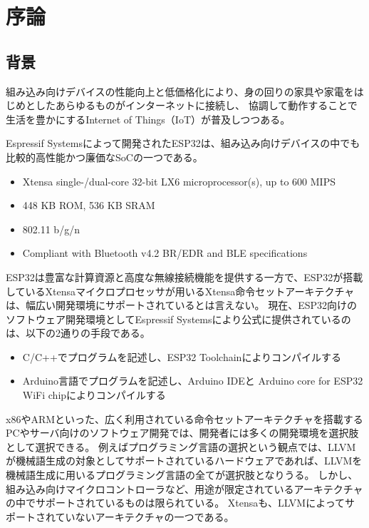 \chapter{序論}
\label{chap:introduction}

\section{背景}
\label{section:background}

組み込み向けデバイスの性能向上と低価格化により、身の回りの家具や家電をはじめとしたあらゆるものがインターネットに接続し、
協調して動作することで生活を豊かにするInternet of Things（IoT）が普及しつつある。

Espressif Systemsによって開発されたESP32\cite{esp32}は、組み込み向けデバイスの中でも比較的高性能かつ廉価なSoCの一つである。

\begin{itemize}
  \item Xtensa single-/dual-core 32-bit LX6 microprocessor(s), up to 600 MIPS
  \item 448 KB ROM, 536 KB SRAM
  \item 802.11 b/g/n
  \item Compliant with Bluetooth v4.2 BR/EDR and BLE specifications
\end{itemize}

ESP32は豊富な計算資源と高度な無線接続機能を提供する一方で、ESP32が搭載しているXtensaマイクロプロセッサが用いるXtensa命令セットアーキテクチャ\cite{xtensa_isa}は、幅広い開発環境にサポートされているとは言えない。
現在、ESP32向けのソフトウェア開発環境としてEspressif Systemsにより公式に提供されているのは、以下の2通りの手段である\cite{esp_toolchain}。
\begin{itemize}
  \item C/C++でプログラムを記述し、ESP32 Toolchainによりコンパイルする
  \item Arduino言語でプログラムを記述し、Arduino IDEと
        Arduino core for ESP32 WiFi chipによりコンパイルする
\end{itemize}

x86やARMといった、広く利用されている命令セットアーキテクチャを搭載するPCやサーバ向けのソフトウェア開発では、開発者には多くの開発環境を選択肢として選択できる。
例えばプログラミング言語の選択という観点では、LLVMが機械語生成の対象としてサポートされているハードウェアであれば、LLVMを機械語生成に用いるプログラミング言語の全てが選択肢となりうる。
しかし、組み込み向けマイクロコントローラなど、用途が限定されているアーキテクチャの中でサポートされているものは限られている\cite{llvm_matrix}。
Xtensaも、LLVMによってサポートされていないアーキテクチャの一つである。

